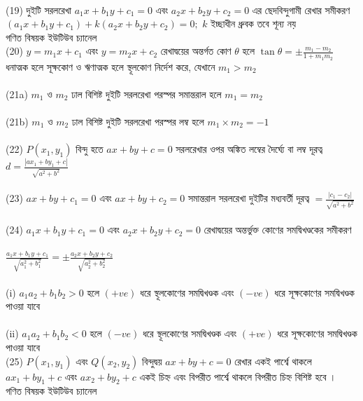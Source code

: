 \documentclass{article}
\begin{document}
				\\
			(19)	দুইটি সরলরেখা 	$a_1x+b_1y+c_1=0$ এবং  $a_2x+b_2y+c_2=0$  এর ছেদবিন্দুগামী রেখার সমীকরণ $(a_1x+b_1y+c_1)+k(a_2x+b_2y+c_2)=0;$ $k$ ইচ্ছাধীন ধ্রুবক তবে শূন্য নয় \\
				গণিত বিষয়ক ইউটিউব চ্যানেল \\
			(20)	$y=m_1x+c_1$ এবং	$y=m_2x+c_2$ রেখাদ্বয়ের অন্তর্গত কোণ $\theta$ হলে  $\tan \theta= \pm \frac{m_1-m_2}{1+m_1m_2}$ ধনাত্মক হলে সূক্ষকোণ ও ঋণাত্মক হলে স্থূলকোণ নির্দেশ করে, যেখানে  $m_1>m_2$\\
				\\
			(21a)	$m_1$  ও $m_2$ ঢাল বিশিষ্ট দুইটি সরলরেখা পরস্পর সমান্তরাল হলে  $m_1=m_2$\\
				\\
				(21b)	$m_1$  ও $m_2$ ঢাল বিশিষ্ট দুইটি সরলরেখা পরস্পর লম্ব হলে  $m_1 \times m_2=-1$\\
					\\
			(22)	$P(x_1,y_1)$ বিন্দু হতে $ax+by+c=0$ সরলরেখার ওপর অঙ্কিত লম্বের দৈর্ঘ্যে বা লম্ব দূরত্ব \\
				 $d=\frac{|ax_1+by_1+c|}{\sqrt{a^2+b^2}}$\\
				 \\
				(23)  $ax+by+c_1=0$ এবং $ax+by+c_2=0$ সমান্তরাল সরলরেখা দুইটির মধ্যবর্তী দূরত্ব $=\frac{|c_1-c_2|}{\sqrt{a^2+b^2}}$\\
				 \\
				(24)	$a_1x+b_1y+c_1=0$ এবং  $a_2x+b_2y+c_2=0$  রেখাদ্বয়ের অন্তর্ভুক্ত কোণের সমদ্বিখণ্ডকের সমীকরণ\\
					\\ 
				 $\frac{a_1x+b_1y+c_1}{\sqrt{a_1^2+b_1^2}}=\pm \frac{a_2x+b_2y+c_2}{\sqrt{a_2^2+b_2^2}}$\\
				 \\
				(i) $a_1a_2+b_1b_2>0$ হলে $(+ve)$ ধরে স্থূলকোণের সমদ্বিখণ্ডক এবং $(-ve)$ ধরে সূক্ষকোণের সমদ্বিখণ্ডক পাওয়া যাবে \\
				\\ 
				 (ii) $a_1a_2+b_1b_2<0$ হলে $(-ve)$ ধরে স্থূলকোণের সমদ্বিখণ্ডক এবং $(+ve)$ ধরে সূক্ষকোণের সমদ্বিখণ্ডক পাওয়া যাবে \\
				(25) $P(x_1,y_1)$ এবং $Q(x_2,y_2)$ বিন্দুদ্বয়  $ax+by+c=0$ রেখার একই পার্শ্বে থাকলে  $ax_1+by_1+c$ এবং $ax_2+by_2+c$ একই চিহ্ন এবং বিপরীত পার্শ্বে থাকলে বিপরীত চিহ্ন বিশিষ্ট হবে । \\ 
					গণিত বিষয়ক ইউটিউব চ্যানেল \\
				
			 	
\end{document}
